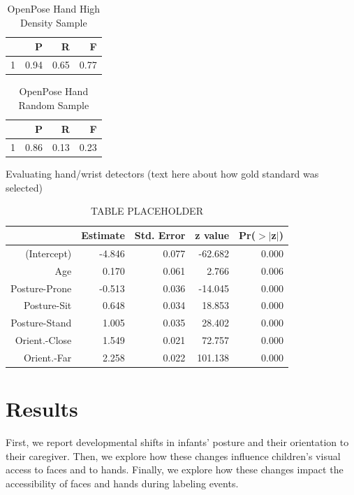 \documentclass[10pt, letterpaper]{article}
\begin{document}
\begin{table}[H]
\centering
\begin{tabular}{rrrr}
  \hline
 & P & R & F \\ 
  \hline
1 & 0.94 & 0.65 & 0.77 \\ 
   \hline
\end{tabular}
\caption{OpenPose Hand High Density Sample} 
\end{table}\begin{table}[H]
\centering
\begin{tabular}{rrrr}
  \hline
 & P & R & F \\ 
  \hline
1 & 0.86 & 0.13 & 0.23 \\ 
   \hline
\end{tabular}
\caption{OpenPose Hand Random Sample} 
\end{table}

Evaluating hand/wrist detectors (text here about how gold standard was
selected)

\begin{table}[H]
\centering
\begin{tabular}{rrrrr}
  \hline
 & Estimate & Std. Error & z value & Pr($>$$|$z$|$) \\ 
  \hline
(Intercept) & -4.846 & 0.077 & -62.682 & 0.000 \\ 
  Age & 0.170 & 0.061 & 2.766 & 0.006 \\ 
  Posture-Prone & -0.513 & 0.036 & -14.045 & 0.000 \\ 
  Posture-Sit & 0.648 & 0.034 & 18.853 & 0.000 \\ 
  Posture-Stand & 1.005 & 0.035 & 28.402 & 0.000 \\ 
  Orient.-Close & 1.549 & 0.021 & 72.757 & 0.000 \\ 
  Orient.-Far & 2.258 & 0.022 & 101.138 & 0.000 \\ 
   \hline
\end{tabular}
\caption{TABLE PLACEHOLDER} 
\end{table}

\section{Results}\label{results}

First, we report developmental shifts in infants' posture and their
orientation to their caregiver. Then, we explore how these changes
influence children's visual access to faces and to hands. Finally, we
explore how these changes impact the accessibility of faces and hands
during labeling events.
\end{document}
